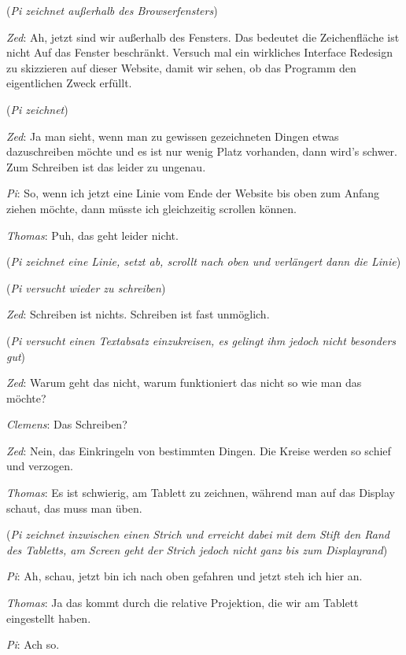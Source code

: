 \medskip (\emph{Pi zeichnet außerhalb des Browserfensters})

\medskip \emph{Zed}: Ah, jetzt sind wir außerhalb des Fensters. Das bedeutet die Zeichenfläche ist nicht Auf das Fenster beschränkt. Versuch mal ein wirkliches Interface Redesign zu skizzieren auf dieser Website, damit wir sehen, ob das Programm den eigentlichen Zweck erfüllt.

\medskip (\emph{Pi zeichnet})

\medskip \emph{Zed}: Ja man sieht, wenn man zu gewissen gezeichneten Dingen etwas dazuschreiben möchte und es ist nur wenig Platz vorhanden, dann wird's schwer. Zum Schreiben ist das leider zu ungenau.

\medskip \emph{Pi}: So, wenn ich jetzt eine Linie vom Ende der Website bis oben zum Anfang ziehen möchte, dann müsste ich gleichzeitig scrollen können.

\medskip \emph{Thomas}: Puh, das geht leider nicht.

\medskip (\emph{Pi zeichnet eine Linie, setzt ab, scrollt nach oben und verlängert dann die Linie})

\medskip (\emph{Pi versucht wieder zu schreiben})

\medskip \emph{Zed}: Schreiben ist nichts. Schreiben ist fast unmöglich.

\medskip (\emph{Pi versucht einen Textabsatz einzukreisen, es gelingt ihm jedoch nicht besonders gut})

\medskip \emph{Zed}: Warum geht das nicht, warum funktioniert das nicht so wie man das möchte?

\medskip \emph{Clemens}: Das Schreiben?

\medskip \emph{Zed}: Nein, das Einkringeln von bestimmten Dingen. Die Kreise werden so schief und verzogen.

\medskip \emph{Thomas}: Es ist schwierig, am Tablett zu zeichnen, während man auf das Display schaut, das muss man üben.

\medskip (\emph{Pi zeichnet inzwischen einen Strich und erreicht dabei mit dem Stift den Rand des Tabletts, am Screen geht der Strich jedoch nicht ganz bis zum Displayrand})

\medskip \emph{Pi}: Ah, schau, jetzt bin ich nach oben gefahren und jetzt steh ich hier an.

\medskip \emph{Thomas}: Ja das kommt durch die relative Projektion, die wir am Tablett eingestellt haben.

\medskip \emph{Pi}: Ach so.

